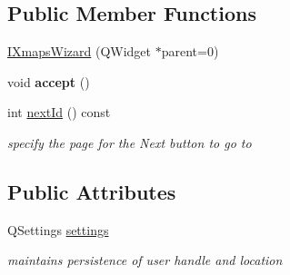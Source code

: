 \subsection*{Public Member Functions}
\begin{CompactItemize}
\item 
\hyperlink{classIXmapsWizard_eb12ce3ab9cfbc2fcd1f7c84adfedea2}{IXmapsWizard} (QWidget $\ast$parent=0)
\item 
\hypertarget{classIXmapsWizard_1bf28b23ffc2f940a50d25a16451a1ee}{
void \textbf{accept} ()}
\label{classIXmapsWizard_1bf28b23ffc2f940a50d25a16451a1ee}

\item 
\hypertarget{classIXmapsWizard_d6b66334f498aa74e4bcbfee8e5c860f}{
int \hyperlink{classIXmapsWizard_d6b66334f498aa74e4bcbfee8e5c860f}{nextId} () const }
\label{classIXmapsWizard_d6b66334f498aa74e4bcbfee8e5c860f}

\begin{CompactList}\small\item\em specify the page for the Next button to go to \item\end{CompactList}\end{CompactItemize}
\subsection*{Public Attributes}
\begin{CompactItemize}
\item 
\hypertarget{classIXmapsWizard_98b515903af0f288c66ca50fe43d348f}{
QSettings \hyperlink{classIXmapsWizard_98b515903af0f288c66ca50fe43d348f}{settings}}
\label{classIXmapsWizard_98b515903af0f288c66ca50fe43d348f}

\begin{CompactList}\small\item\em maintains persistence of user handle and location \item\end{CompactList}\end{CompactItemize}

